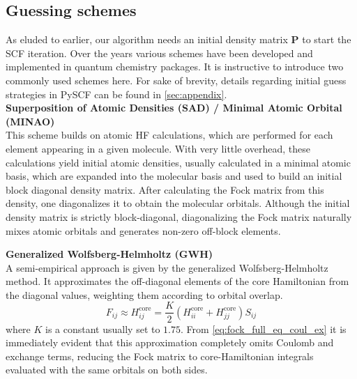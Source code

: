 \subsection{Guessing schemes}
\label{subsec:background_hf_guessing}
As eluded to earlier, our algorithm needs an initial density matrix $\mathbf{P}$ to start the SCF iteration. Over the years various schemes have been developed and implemented in quantum chemistry packages. It is instructive to introduce two commonly used schemes here. For sake of brevity, details regarding initial guess strategies in PySCF can be found in \autoref{sec:appendix}.\\

\textbf{Superposition of Atomic Densities (SAD) / Minimal Atomic Orbital (MINAO)}\\
This scheme builds on atomic HF calculations, which are performed for each element appearing in a given molecule. With very little overhead, these calculations yield initial atomic densities, usually calculated in a minimal atomic basis, which are expanded into the molecular basis and used to build an initial block diagonal density matrix. After calculating the Fock matrix from this density, one diagonalizes it to obtain the molecular orbitals. Although the initial density matrix is strictly block-diagonal, diagonalizing the Fock matrix naturally mixes atomic orbitals and generates non-zero off-block elements. \parencite{ref:sad_guess}

\textbf{Generalized Wolfsberg-Helmholtz (GWH)}\\
A semi-empirical approach is given by the generalized Wolfsberg-Helmholtz method. It approximates the off-diagonal elements of the core Hamiltonian from the diagonal values, weighting them according to orbital overlap.
\begin{equation}
    \label{eq:gwh}
    F_{ij} \approx H^{\text{core}}_{ij} = \frac{K}{2}(H^{\text{core}}_{ii} + H^{\text{core}}_{jj})S_{ij}
\end{equation}
where $K$ is a constant usually set to $1.75$. From \autoref{eq:fock_full_eq_coul_ex} it is immediately evident that this approximation completely omits Coulomb and exchange terms, reducing the Fock matrix to core-Hamiltonian integrals evaluated with the same orbitals on both sides. \parencite{ref:gwh_wolfsberg1952spectra, ref:Lehtola2019}

